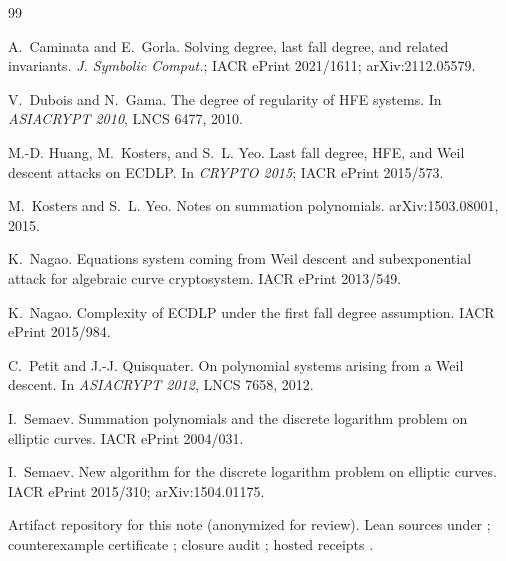 \documentclass[11pt,a4paper]{article}
\theoremstyle{plain}
\theoremstyle{definition}
\theoremstyle{remark}
\begin{document}
\begin{thebibliography}{99}

A.~Caminata and E.~Gorla.
\newblock Solving degree, last fall degree, and related invariants.
\newblock \emph{J. Symbolic Comput.}; IACR ePrint 2021/1611; arXiv:2112.05579.

V.~Dubois and N.~Gama.
\newblock The degree of regularity of {HFE} systems.
\newblock In \emph{ASIACRYPT 2010}, LNCS 6477, 2010.

M.-D. Huang, M.~Kosters, and S.~L. Yeo.
\newblock Last fall degree, {HFE}, and {W}eil descent attacks on {ECDLP}.
\newblock In \emph{CRYPTO 2015}; IACR ePrint 2015/573.

M.~Kosters and S.~L. Yeo.
\newblock Notes on summation polynomials.
\newblock arXiv:1503.08001, 2015.

K.~Nagao.
\newblock Equations system coming from {W}eil descent and subexponential
  attack for algebraic curve cryptosystem.
\newblock IACR ePrint 2013/549.

K.~Nagao.
\newblock Complexity of {ECDLP} under the first fall degree assumption.
\newblock IACR ePrint 2015/984.

C.~Petit and J.-J. Quisquater.
\newblock On polynomial systems arising from a {W}eil descent.
\newblock In \emph{ASIACRYPT 2012}, LNCS 7658, 2012.

I.~Semaev.
\newblock Summation polynomials and the discrete logarithm problem on
  elliptic curves.
\newblock IACR ePrint 2004/031.

I.~Semaev.
\newblock New algorithm for the discrete logarithm problem on elliptic
  curves.
\newblock IACR ePrint 2015/310; arXiv:1504.01175.

Artifact repository for this note (anonymized for review). Lean sources
under ; counterexample certificate
; closure audit
; hosted receipts
.

\end{thebibliography}
\end{document}
